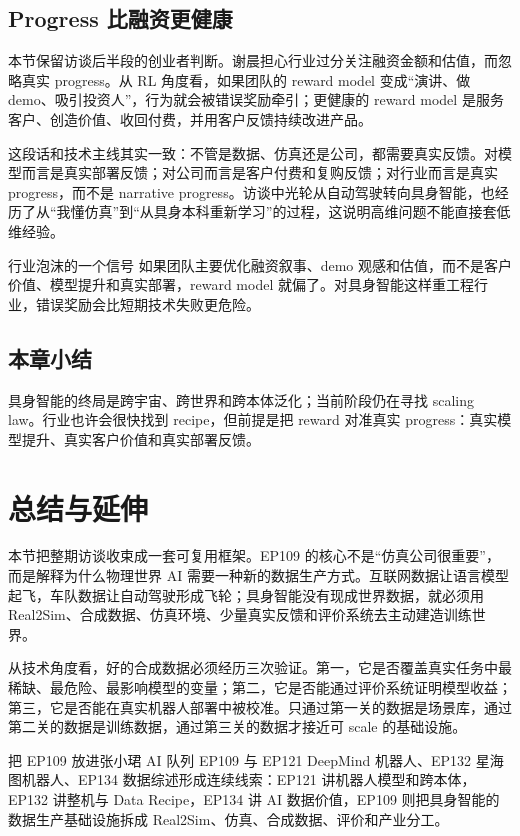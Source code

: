 \documentclass[a4paper]{article}
\begin{document}
\subsection{Progress 比融资更健康}

本节保留访谈后半段的创业者判断。谢晨担心行业过分关注融资金额和估值，而忽略真实 progress。从 RL 角度看，如果团队的 reward model 变成“演讲、做 demo、吸引投资人”，行为就会被错误奖励牵引；更健康的 reward model 是服务客户、创造价值、收回付费，并用客户反馈持续改进产品。

这段话和技术主线其实一致：不管是数据、仿真还是公司，都需要真实反馈。对模型而言是真实部署反馈；对公司而言是客户付费和复购反馈；对行业而言是真实 progress，而不是 narrative progress。访谈中光轮从自动驾驶转向具身智能，也经历了从“我懂仿真”到“从具身本科重新学习”的过程，这说明高维问题不能直接套低维经验。

\begin{warningbox}{行业泡沫的一个信号}
如果团队主要优化融资叙事、demo 观感和估值，而不是客户价值、模型提升和真实部署，reward model 就偏了。对具身智能这样重工程行业，错误奖励会比短期技术失败更危险。
\end{warningbox}

\subsection{本章小结}

具身智能的终局是跨宇宙、跨世界和跨本体泛化；当前阶段仍在寻找 scaling law。行业也许会很快找到 recipe，但前提是把 reward 对准真实 progress：真实模型提升、真实客户价值和真实部署反馈。

\section{总结与延伸}

本节把整期访谈收束成一套可复用框架。EP109 的核心不是“仿真公司很重要”，而是解释为什么物理世界 AI 需要一种新的数据生产方式。互联网数据让语言模型起飞，车队数据让自动驾驶形成飞轮；具身智能没有现成世界数据，就必须用 Real2Sim、合成数据、仿真环境、少量真实反馈和评价系统去主动建造训练世界。

从技术角度看，好的合成数据必须经历三次验证。第一，它是否覆盖真实任务中最稀缺、最危险、最影响模型的变量；第二，它是否能通过评价系统证明模型收益；第三，它是否能在真实机器人部署中被校准。只通过第一关的数据是场景库，通过第二关的数据是训练数据，通过第三关的数据才接近可 scale 的基础设施。

\begin{importantbox}{把 EP109 放进张小珺 AI 队列}
EP109 与 EP121 DeepMind 机器人、EP132 星海图机器人、EP134 数据综述形成连续线索：EP121 讲机器人模型和跨本体，EP132 讲整机与 Data Recipe，EP134 讲 AI 数据价值，EP109 则把具身智能的数据生产基础设施拆成 Real2Sim、仿真、合成数据、评价和产业分工。
\end{importantbox}
\end{document}
